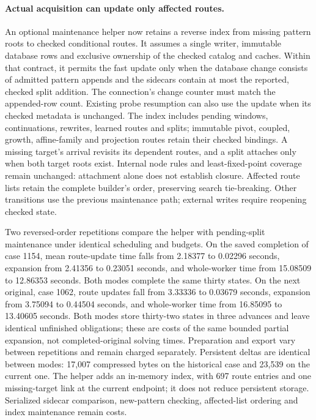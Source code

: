 \documentclass[11pt,a4paper]{article}
\numberwithin{equation}{section}
\theoremstyle{plain}
\theoremstyle{definition}
\theoremstyle{remark}
\begin{document}
\paragraph{Actual acquisition can update only affected routes.}
An optional maintenance helper now retains a reverse index from missing pattern roots to checked conditional routes. It assumes a single writer, immutable database rows and exclusive ownership of the checked catalog and caches. Within that contract, it permits the fast update only when the database change consists of admitted pattern appends and the sidecars contain at most the reported, checked split addition. The connection's change counter must match the appended-row count. Existing probe resumption can also use the update when its checked metadata is unchanged. The index includes pending windows, continuations, rewrites, learned routes and splits; immutable pivot, coupled, growth, affine-family and projection routes retain their checked bindings. A missing target's arrival revisits its dependent routes, and a split attaches only when both target roots exist. Internal node rules and least-fixed-point coverage remain unchanged: attachment alone does not establish closure. Affected route lists retain the complete builder's order, preserving search tie-breaking. Other transitions use the previous maintenance path; external writes require reopening checked state.

Two reversed-order repetitions compare the helper with pending-split maintenance under identical scheduling and budgets. On the saved completion of case 1154, mean route-update time falls from 2.18377 to 0.02296 seconds, expansion from 2.41356 to 0.23051 seconds, and whole-worker time from 15.08509 to 12.86353 seconds. Both modes complete the same thirty states. On the next original, case 1062, route updates fall from 3.33336 to 0.03679 seconds, expansion from 3.75094 to 0.44504 seconds, and whole-worker time from 16.85095 to 13.40605 seconds. Both modes store thirty-two states in three advances and leave identical unfinished obligations; these are costs of the same bounded partial expansion, not completed-original solving times. Preparation and export vary between repetitions and remain charged separately. Persistent deltas are identical between modes: 17,007 compressed bytes on the historical case and 23,539 on the current one. The helper adds an in-memory index, with 697 route entries and one missing-target link at the current endpoint; it does not reduce persistent storage. Serialized sidecar comparison, new-pattern checking, affected-list ordering and index maintenance remain costs.
\end{document}

